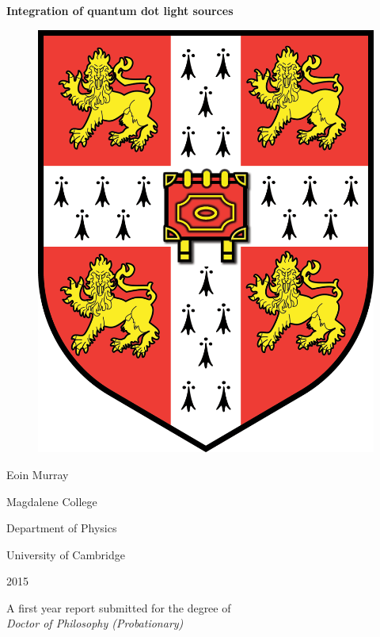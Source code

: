 

\begin{center} \LARGE{\textbf{Integration of quantum dot light sources}}
\end{center}

\vspace{1cm}

\begin{figure}[h] \begin{center}
\includegraphics[scale=0.15]{images/cam_logo.png} \end{center} \end{figure}

\begin{center} \Large{Eoin Murray} \par \normalsize{Magdalene College} \par
\normalsize{Department of Physics} \par \normalsize{University of Cambridge}
\par 2015 \end{center}

\begin{center} A first year report submitted for the degree of \\ \textit{Doctor
of Philosophy (Probationary)} \end{center} 
